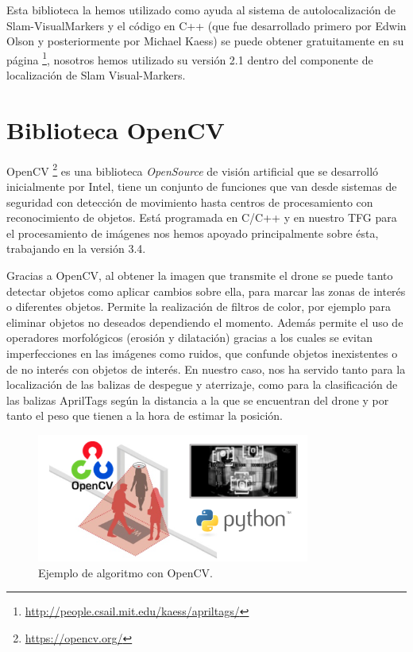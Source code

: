\hspace{1cm} Esta biblioteca la hemos utilizado como ayuda al sistema de autolocalización de Slam-VisualMarkers y el código en C++ (que fue desarrollado primero por Edwin Olson y posteriormente por Michael Kaess) se puede obtener gratuitamente en su página \footnote{\url{http://people.csail.mit.edu/kaess/apriltags/}}, nosotros hemos utilizado su versión 2.1 dentro del componente de localización de Slam Visual-Markers.

\section{Biblioteca OpenCV}
\hspace{1cm} OpenCV \footnote{\url{https://opencv.org/}} es una biblioteca \textit{OpenSource} de visión artificial que se desarrolló inicialmente por Intel, tiene un conjunto de funciones que van desde sistemas de seguridad con detección de movimiento hasta centros de procesamiento con reconocimiento de objetos. Está programada en C/C++ y en nuestro TFG para el procesamiento de imágenes nos hemos apoyado principalmente sobre ésta, trabajando en la versión 3.4. 

\hspace{1cm} Gracias a OpenCV, al obtener la imagen que transmite el drone se puede tanto detectar objetos como aplicar cambios sobre ella, para marcar las zonas de interés o diferentes objetos. Permite la realización de filtros de color, por ejemplo para eliminar objetos no deseados dependiendo el momento. Además permite el uso de operadores morfológicos (erosión y dilatación) gracias a los cuales se evitan imperfecciones en las imágenes como ruidos, que confunde objetos inexistentes o de no interés con objetos de interés. En nuestro caso, nos ha servido tanto para la localización de las balizas de despegue y aterrizaje, como para la clasificación de las balizas AprilTags según la distancia a la que se encuentran del drone y por tanto el peso que tienen a la hora de estimar la posición.
\\

\begin{figure}[H]
	\begin{center}
		\includegraphics[width=0.8\textwidth]{imag/IMG26.png}
				\caption{Ejemplo de algoritmo con OpenCV.} 
	\label{fig:OpenCV.}	
	\end{center}
\end{figure}


